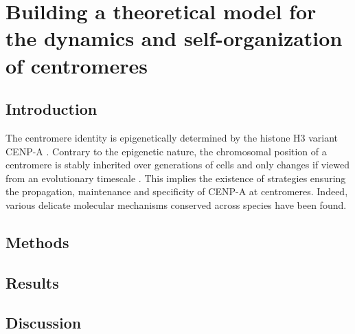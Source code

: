 \chapter{Building a theoretical model for the dynamics and self-organization of centromeres}

\section{Introduction}

The centromere identity is epigenetically determined by the histone H3 variant CENP-A \citep{Warburton1997ImmunolocalizationCentromeres, Vafa1997ChromatinPlate, Earnshaw1985ThreeChromosome, Liu2006MappingCells, Regnier2005CENP-ABubR1, Heun2006, Mendiburo2011, Barnhart2011, Logsdon2015}. Contrary to the epigenetic nature, the chromosomal position of a centromere is stably inherited over generations of cells and only changes if viewed from an evolutionary timescale \citep{Amor2004HumanProgress, Murphy2005DynamicsMaps}. This implies the existence of strategies ensuring the propagation, maintenance and specificity of CENP-A at centromeres. Indeed, various delicate molecular mechanisms conserved across species have been found. 

 
\section{Methods}
\section{Results}
\section{Discussion}
